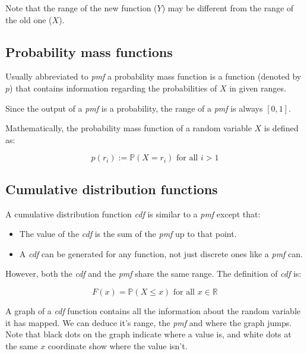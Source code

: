 Note that the range of the new function ($Y$) may be different from the range of
the old one ($X$).

\subsection{Probability mass functions}

Usually abbreviated to {\it pmf} a probability mass function is a function
(denoted by $p$) that contains information regarding the probabilities of $X$ in
given ranges.

Since the output of a {\it pmf} is a probability, the range of a {\it pmf} is
always $[0,1]$.

Mathematically, the probability mass function of a random variable $X$ is
defined as:

\begin{dmath}
	p(r_i) := \mathbb{P}(X = r_i) \textrm{ for all $i > 1$}
\end{dmath}


\subsection{Cumulative distribution functions}

A cumulative distribution function {\it cdf} is similar to a {\it pmf} except
that:

\begin{itemize}
	\item The value of the {\it cdf} is the sum of the {\it pmf} up to that 
	point.
	\item A {\it cdf} can be generated for any function, not just discrete ones
	like a {\it pmf} can.
\end{itemize}

However, both the {\it cdf} and the {\it pmf} share the same range. The
definition of {\it cdf} is:

\begin{dmath}
	{F(x) = \mathbb{P}(X \leq x)} \textrm{ for all $x \in \mathbb{R}$}
\end{dmath}

A graph of a {\it cdf} function contains all the information about the random
variable it has mapped. We can deduce it's range, the {\it pmf} and where the
graph jumps. Note that black dots on the graph indicate where a value is, and
white dots at the same $x$ coordinate show where the value isn't.


